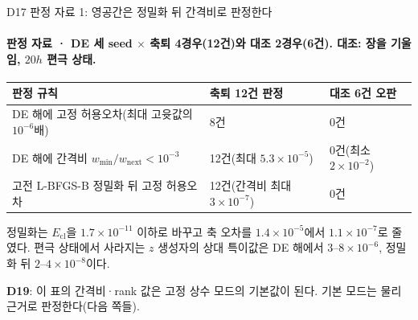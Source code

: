 \begin{frame}[label=state-selection-null-criteria]{D17 판정 자료 1: 영공간은 정밀화 뒤 간격비로 판정한다}
  \framesubtitle{판정 자료 · DE 세 seed $\times$ 축퇴 4경우(12건)와 대조 2경우(6건). 대조: 장을 기울임, $20h$ 편극 상태.}
  \small
  \begin{tabularx}{\textwidth}{@{}YP{3.0cm}P{3.0cm}@{}}
    \toprule
    판정 규칙 & 축퇴 12건 판정 & 대조 6건 오판 \\
    \midrule
    DE 해에 고정 허용오차(최대 고윳값의 $10^{-6}$배) & 8건 & 0건 \\
    DE 해에 간격비 $w_{\min}/w_{\mathrm{next}}<10^{-3}$ & 12건(최대 $5.3\times10^{-5}$) & 0건(최소 $2\times10^{-2}$) \\
    고전 L-BFGS-B 정밀화 뒤 고정 허용오차 & 12건(간격비 최대 $3\times10^{-7}$) & 0건 \\
    \bottomrule
  \end{tabularx}
  \par\medskip
  정밀화는 $E_{\mathrm{cl}}$을 $1.7\times10^{-11}$ 이하로 바꾸고 축 오차를 $1.4\times10^{-5}$에서 $1.1\times10^{-7}$로 줄였다.
  편극 상태에서 사라지는 $z$ 생성자의 상대 특이값은 DE 해에서 $3$--$8\times10^{-6}$, 정밀화 뒤 $2$--$4\times10^{-8}$이다.
  \par\medskip
  \textbf{D19}: 이 표의 간격비·rank 값은 고정 상수 모드의 기본값이 된다. 기본 모드는 물리 근거로 판정한다(다음 쪽들).
  \par\medskip
\end{frame}

